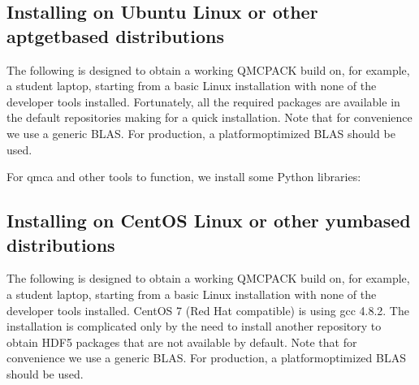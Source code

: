 \documentclass[letterpaper,10pt,english]{sphinxmanual}
\begin{document}
\subsection{Installing on Ubuntu Linux or other apt\sphinxhyphen{}get\textendash{}based distributions}
\label{\detokenize{installation:installing-on-ubuntu-linux-or-other-apt-get-based-distributions}}\label{\detokenize{installation:buildubuntu}}
The following is designed to obtain a working QMCPACK build on, for example, a
student laptop, starting from a basic Linux installation with none of
the developer tools installed. Fortunately, all the required packages
are available in the default repositories making for a quick
installation. Note that for convenience we use a generic BLAS. For
production, a platform\sphinxhyphen{}optimized BLAS should be used.

\begin{sphinxVerbatim}[commandchars=\\\{\}]
     
     
 
 
 
  
  
\end{sphinxVerbatim}

For qmca and other tools to function, we install some Python libraries:

\begin{sphinxVerbatim}[commandchars=\\\{\}]
    
\end{sphinxVerbatim}


\subsection{Installing on CentOS Linux or other yum\sphinxhyphen{}based distributions}
\label{\detokenize{installation:installing-on-centos-linux-or-other-yum-based-distributions}}
The following is designed to obtain a working QMCPACK build on, for example, a
student laptop, starting from a basic Linux installation with none of
the developer tools installed. CentOS 7 (Red Hat compatible) is using
gcc 4.8.2. The installation is complicated only by the need to install
another repository to obtain HDF5 packages that are not available by
default. Note that for convenience we use a generic BLAS. For
production, a platform\sphinxhyphen{}optimized BLAS should be used.
\end{document}
